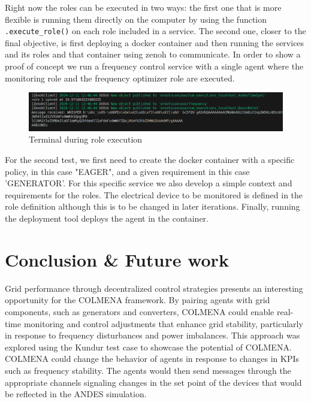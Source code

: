 \documentclass{article}
\begin{document}
Right now the roles can be executed in two ways: the first one that is more flexible is running them directly on the computer by using the function \texttt{.execute\_role()} on each role included in a service. The second one, closer to the final objective, is first deploying a docker container and then running the services and its roles and that container using zenoh to communicate. In order to show a proof of concept we run a frequency control service with a single agent where the monitoring role and the frequency optimizer role are executed.  

\begin{figure}[H] %
    \centering
    \includegraphics[width=1\textwidth]{pictures/screen_roles.png}
    \caption{Terminal during role execution}
    \label{fig:example_image}
\end{figure}

For the second test, we first need to create the docker container with a specific policy, in this case "EAGER", and a given requirement in this case 'GENERATOR'. For this specific service we also develop a simple context and requirements for the roles. The electrical device to be monitored is defined in the role definition although this is to be changed in later iterations. Finally, running the deployment tool deploys the agent in the container. 

\section{Conclusion \& Future work}

Grid performance through decentralized control strategies presents an interesting opportunity for the COLMENA framework. By pairing agents with grid components, such as generators and converters, COLMENA could enable real-time monitoring and control adjustments that enhance grid stability, particularly in response to frequency disturbances and power imbalances. This approach was explored using the Kundur test case to showcase the potential of COLMENA. COLMENA could change the behavior of agents in response to changes in KPIs such as frequency stability. The agents would then send messages through the appropriate channels signaling changes in the set point of the devices that would be reflected in the ANDES simulation.
\end{document}
